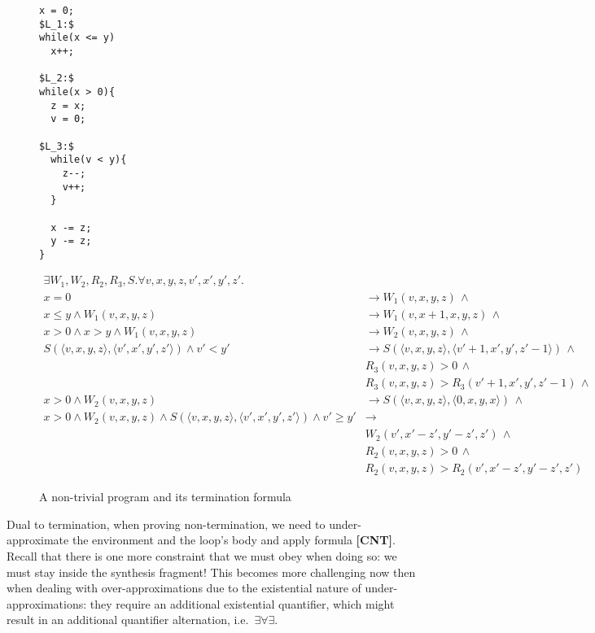 \documentclass[preprint]{sigplanconf}
\theoremstyle{definition}
\begin{document}
\begin{figure*}
\begin{framed}
\begin{minipage}{0.17\textwidth}
\begin{lstlisting}[mathescape=true]
x = 0;
$L_1:$
while(x <= y)
  x++;

$L_2:$
while(x > 0){
  z = x;
  v = 0;

$L_3:$
  while(v < y){
    z--;
    v++;
  }

  x -= z;
  y -= z;
}
\end{lstlisting}
\end{minipage}
\vline
\begin{minipage}{0.85\textwidth}
\begin{align*}
 \exists W_1, W_2, R_2, R_3, S . \forall v, x, y, z, v', x', y', z' . \\
   x = 0 & \rightarrow W_1(v, x, y, z) \, \wedge \\
   x \leq y \wedge W_1(v, x, y, z) & \rightarrow W_1(v, x+1, x, y, z) \, \wedge \\
   x > 0 \wedge x > y \wedge W_1(v, x, y, z) & \rightarrow W_2(v, x, y, z) \, \wedge \\
   S(\langle v, x, y, z \rangle, \langle v', x', y', z' \rangle) \wedge v' < y' & \rightarrow S(\langle v, x, y, z \rangle, \langle v'+1, x', y', z'-1 \rangle) \, \wedge \\
   & R_3(v,x,y,z) > 0 \, \wedge \\
   & R_3(v,x,y,z) > R_3(v'+1,x',y',z'-1) \, \wedge\\
   x > 0 \wedge W_2(v, x, y, z) & \rightarrow S(\langle v, x, y, z \rangle, \langle 0, x, y, x \rangle) \, \wedge \\
   x > 0 \wedge W_2(v, x, y, z) \wedge S(\langle v, x, y, z \rangle, \langle v', x', y', z' \rangle) \wedge v' \geq y' & \rightarrow \\
   & W_2(v', x' - z', y' - z', z') \, \wedge \\
   & R_2(v, x, y, z) > 0 \, \wedge \\
   & R_2(v, x, y, z) > R_2(v', x' - z', y'-z', z')
\end{align*}
\end{minipage}
\end{framed}
\caption{A non-trivial program and its termination formula\label{fig:environment-model}}
\end{figure*}

Dual to termination, when proving non-termination, we need to
under-approximate the environment and the loop's body and apply
formula {\bf [CNT]}.
Recall that there is one more constraint that we must obey when doing so: we
must stay inside the synthesis fragment!  This becomes more challenging now
then when dealing with over-approximations due to the existential nature of
under-approximations: they require an additional existential quantifier,
which might result in an additional quantifier alternation, i.e.~$\exists
\forall \exists$.
\end{document}
